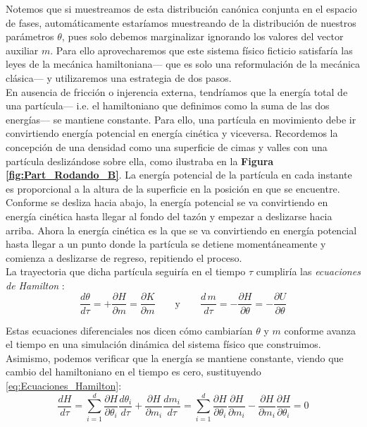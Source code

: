  Notemos que si muestreamos de esta distribución canónica conjunta en el espacio de fases, automáticamente estaríamos muestreando de la distribución de nuestros parámetros $\theta$, pues solo debemos marginalizar ignorando los valores del vector auxiliar $m$. Para ello aprovecharemos que este sistema físico ficticio satisfaría las leyes de la mecánica hamiltoniana--- que es solo una reformulación de la mecánica clásica--- y utilizaremos una estrategia de dos pasos.\\ 
 
 En ausencia de fricción o injerencia externa, tendríamos que la energía total de una partícula--- i.e. el hamiltoniano que definimos como la suma de las dos energías--- se mantiene constante. Para ello, una partícula en movimiento debe ir convirtiendo energía potencial en energía cinética y viceversa. Recordemos la concepción de una densidad como una superficie de cimas y valles con una partícula deslizándose sobre ella, como ilustraba en la \textbf{Figura \ref{fig:Part_Rodando_B}}. La energía potencial de la partícula en cada instante es proporcional a la altura de la superficie en la posición en que se encuentre. Conforme se desliza hacia abajo, la energía potencial se va convirtiendo en energía cinética hasta llegar al fondo del tazón y empezar a deslizarse hacia arriba. Ahora la energía cinética es la que se va convirtiendo en energía potencial hasta llegar a un punto donde la partícula se detiene momentáneamente y comienza a deslizarse de regreso, repitiendo el proceso.\\ 
 
 La trayectoria que dicha partícula seguiría en el tiempo $\tau$ cumpliría las \textit{ecuaciones de Hamilton} \parencites{Neal93,Neal11,Betancourt17}: 
 \begin{equation}
 \label{eq:Ecuaciones_Hamilton}
 \dfrac{d\theta}{d\tau}=+\dfrac{\partial H}{\partial m} = \dfrac{\partial K}{\partial m} \qquad \text{y} \qquad \dfrac{d\,m}{d\tau}=-\dfrac{\partial H}{\partial \theta} = -\dfrac{\partial U}{\partial \theta}
 \end{equation}
 
 Estas ecuaciones diferenciales nos dicen cómo cambiarían $\theta$ y $m$ conforme avanza el tiempo en una simulación dinámica del sistema físico que construimos. Asimismo, podemos verificar que la energía se mantiene constante, viendo que cambio del hamiltoniano en el tiempo es cero, sustituyendo \eqref{eq:Ecuaciones_Hamilton}:
 \begin{equation*}
 \dfrac{dH}{d\tau} = \sum\limits_{i=1}^d \dfrac{\partial H}{\partial \theta_i}\dfrac{d\theta_i}{d\tau} + \dfrac{\partial H}{\partial m_i}\dfrac{dm_i}{d\tau} = \sum\limits_{i=1}^d \dfrac{\partial H}{\partial \theta_i}\dfrac{\partial H}{\partial m_i} - \dfrac{\partial H}{\partial m_i}\dfrac{\partial H}{\partial \theta_i} = 0
 \end{equation*}
 

